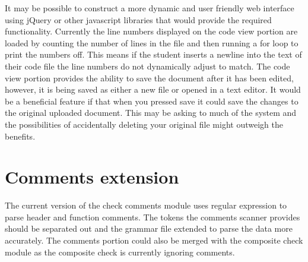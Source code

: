 It may be possible to construct a more dynamic and user friendly web 
interface using jQuery or other javascript libraries that would provide the 
required functionality. Currently the line numbers displayed on the code view
portion are loaded by counting the number of lines in the file and then running
a for loop to print the numbers off. This means if the student inserts a 
newline into the text of their code file the line numbers do not dynamically 
adjust to match. The code view portion provides the ability to save the 
document after it has been edited, however, it is being saved as either a new 
file or opened in a text editor. It would be a beneficial feature if that when
you pressed save it could save the changes to the original uploaded document.
This may be asking to much of the system and the possibilities of accidentally
deleting your original file might outweigh the benefits.


\section{Comments extension}

The current version of the check comments module uses regular expression to 
parse header and function comments. The tokens the comments scanner provides 
should be separated out and the grammar file extended to parse the data more 
accurately. The comments portion could also be merged with the composite check
module as the composite check is currently ignoring comments.
